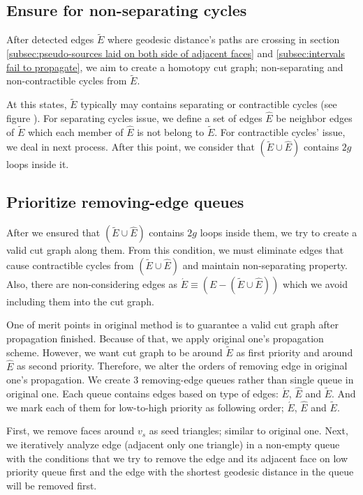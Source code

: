 \documentclass[a4paper,twoside]{article}
\begin{document}
\subsection{Ensure for non-separating cycles}
\label{subsec:ensure non-trivia}
After detected edges $\tilde{E}$ where geodesic distance's paths are crossing in section \ref{subsec:pseudo-sources laid on both side of adjacent faces} and \ref{subsec:intervals fail to propagate}, we aim to create a homotopy cut graph; non-separating and non-contractible cycles from $\tilde{E}$.

At this states, $\tilde{E}$ typically may contains separating or contractible cycles (see figure ).  For separating cycles issue, we define a set of edges $\hat{E}$ be neighbor edges of $\tilde{E}$ which each member of $\hat{E}$ is not belong to $\tilde{E}$. For contractible cycles' issue, we deal in next process. After this point, we consider that $(\tilde{E} \cup \hat{E})$ contains $2g$ loops inside it.  

\subsection{Prioritize removing-edge queues}
After we ensured that $(\tilde{E} \cup \hat{E})$ contains $2g$ loops inside them, we try to create a valid cut graph along them. From this condition, we must eliminate edges that cause contractible cycles from $(\tilde{E} \cup \hat{E})$ and maintain non-separating property. Also, there are non-considering edges as $\acute{E} \equiv (E - (\tilde{E} \cup \hat{E}))$ which we avoid including them into the cut graph.

One of merit points in original method is to guarantee a valid cut graph after propagation finished. Because of that, we apply original one's propagation scheme. However, we want cut graph to be around $\tilde{E}$ as first priority and around $\hat{E}$ as second priority. Therefore, we alter the orders of removing edge in original one's propagation. We create 3 removing-edge queues rather than single queue in original one. Each queue contains edges based on type of edges: 
$\acute{E}$, $\hat{E}$ and $\tilde{E}$.  And we mark each of them for low-to-high priority as following order; $\acute{E}$, $\hat{E}$ and $\tilde{E}$.

First, we remove faces around $v_s$ as seed triangles; similar to original one. Next, we iteratively analyze edge (adjacent only one triangle) in a non-empty queue with the conditions that we try to remove the edge and its adjacent face on low priority queue first and the edge with the shortest geodesic distance in the queue will be removed first.
\end{document}

